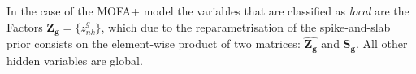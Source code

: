 In the case of the MOFA+ model the variables that are classified as \textit{local} are the Factors $\mathbf{Z_g} = \{ z_{nk}^g \}$, which due to the reparametrisation of the spike-and-slab prior consists on the element-wise product of two matrices: $\hat{\mathbf{Z_g}}$ and $\mathbf{S_g}$. All other hidden variables are global.%





